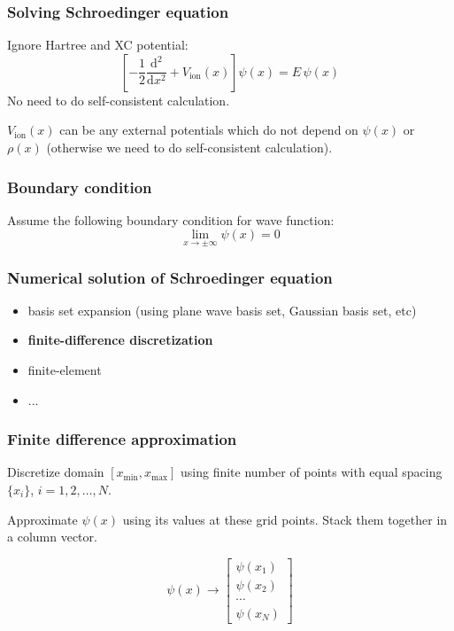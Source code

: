 \begin{frame}
\frametitle{Solving Schroedinger equation}

Ignore Hartree and XC potential:
\begin{equation*}
\left[ -\frac{1}{2}\frac{\mathrm{d}^2}{\mathrm{d}x^2} + V_{\mathrm{ion}}(x) \right] \psi(x) = E\, \psi(x)
\end{equation*}
No need to do self-consistent calculation.

$V_{\mathrm{ion}}(x)$ can be any external potentials which do not depend on $\psi(x)$ or
$\rho(x)$ (otherwise we need to do self-consistent calculation).

\end{frame}


\begin{frame}
\frametitle{Boundary condition}

Assume the following boundary condition for wave function:
\begin{equation*}
\lim_{x \rightarrow \pm \infty} \psi(x) = 0
\end{equation*}

\end{frame}


\begin{frame}
\frametitle{Numerical solution of Schroedinger equation}

\begin{itemize}
\item basis set expansion (using plane wave basis set, Gaussian basis set, etc)
\item \textbf{finite-difference discretization}
\item finite-element
\item ...
\end{itemize}

\end{frame}



\begin{frame}
\frametitle{Finite difference approximation}

Discretize domain $[x_{\mathrm{min}},x_{\mathrm{max}}]$ using finite number
of points with equal spacing $\{ x_{i} \}$, $i = 1,2,\ldots,N$.

Approximate $\psi(x)$ using its values at these grid points. Stack them together
in a column vector.

\begin{equation*}
\psi(x) \rightarrow
\begin{bmatrix}
\psi(x_{1}) \\ \psi(x_{2}) \\ \cdots \\ \psi(x_{N})
\end{bmatrix}
\end{equation*}

\end{frame}



